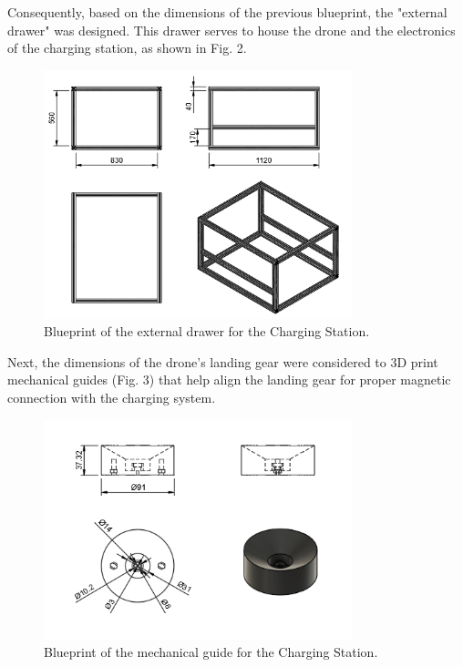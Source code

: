 Consequently, based on the dimensions of the previous blueprint, the "external drawer" was designed. This drawer serves to house the drone and the electronics of the charging station, as shown in Fig. 2.
        \begin{figure}[H]
            \centering
            \includegraphics[width=0.8\textwidth]{PLANOS/PLANOS_CAJON_EXTERNO_1.png}
            \caption{Blueprint of the external drawer for the Charging Station.}
            \label{fig:etiqueta}
        \end{figure}

Next, the dimensions of the drone's landing gear were considered to 3D print mechanical guides (Fig. 3) that help align the landing gear for proper magnetic connection with the charging system.
        \begin{figure}[H]
            \centering
            \includegraphics[width=0.8\textwidth]{PLANOS/PLANO_GUIAS_MECANICAS.png}
            \caption{Blueprint of the mechanical guide for the Charging Station.}
            \label{fig:etiqueta}
        \end{figure}

